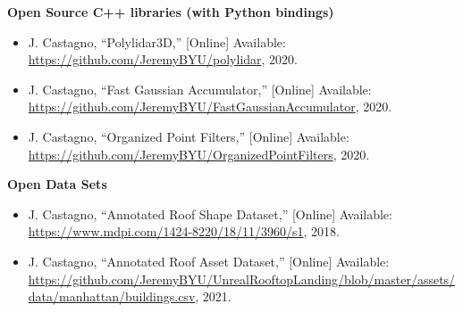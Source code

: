\textbf{Open Source C++ libraries (with Python bindings)}

\begin{itemize}[noitemsep]
    \item J. Castagno, ``Polylidar3D,''   [Online]  Available: \url{https://github.com/JeremyBYU/polylidar}, 2020.
    \item J. Castagno, ``Fast Gaussian Accumulator,''   [Online]  Available: \url{https://github.com/JeremyBYU/FastGaussianAccumulator}, 2020.
    \item J. Castagno, ``Organized Point Filters,''   [Online]  Available: \url{https://github.com/JeremyBYU/OrganizedPointFilters}, 2020.
\end{itemize}

\textbf{Open Data Sets}

\begin{itemize}[noitemsep]
    \item J. Castagno, ``Annotated Roof Shape Dataset,''   [Online]  Available: \url{https://www.mdpi.com/1424-8220/18/11/3960/s1}, 2018.
    \item J. Castagno, ``Annotated Roof Asset Dataset,'' [Online] Available: \url{https://github.com/JeremyBYU/UnrealRooftopLanding/blob/master/assets/data/manhattan/buildings.csv}, 2021.
\end{itemize}
